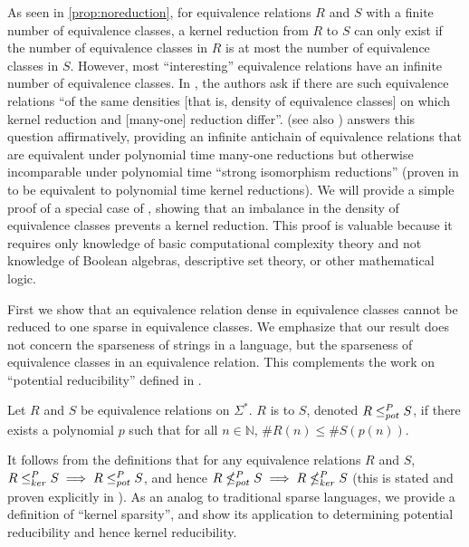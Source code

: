 As seen in \autoref{prop:noreduction}, for equivalence relations $R$ and $S$ with a finite number of equivalence classes, a kernel reduction from $R$ to $S$ can only exist if the number of equivalence classes in $R$ is at most the number of equivalence classes in $S$.
However, most ``interesting'' equivalence relations have an infinite number of equivalence classes.
In \autocite[Section~4]{fg11}, the authors ask if there are such equivalence relations ``of the same densities [that is, density of equivalence classes] on which kernel reduction and [many-one] reduction differ''.
\autocite[Theorem~5.1]{bcffm} (see also \autocite[Remark~5.2]{bcffm}) answers this question affirmatively, providing an infinite antichain of equivalence relations that are equivalent under polynomial time many-one reductions but otherwise incomparable under polynomial time ``strong isomorphism reductions'' (proven in \autocite[Section~7]{bcffm} to be equivalent to polynomial time kernel reductions).
We will provide a simple proof of a special case of \autocite[Theorem~5.1]{bcffm}, showing that an imbalance in the density of equivalence classes prevents a kernel reduction.
This proof is valuable because it requires only knowledge of basic computational complexity theory and not knowledge of Boolean algebras, descriptive set theory, or other mathematical logic.

First we show that an equivalence relation dense in equivalence classes cannot be reduced to one sparse in equivalence classes.
We emphasize that our result does not concern the sparseness of strings in a language, but the sparseness of equivalence classes in an equivalence relation.
This complements the work on ``potential reducibility'' defined in \autocite[Section~5]{bcffm}.

\begin{definition}
  Let $R$ and $S$ be equivalence relations on $\Sigma^*$.
  $R$ is  to $S$, denoted $R\leq^{P}_{pot} S$, if there exists a polynomial $p$ such that for all $n\in\mathbb{N}$, $\#R(n)\leq \#S(p(n))$.
\end{definition}

It follows from the definitions that for any equivalence relations $R$ and $S$, $R\leq^{P}_{ker} S\implies R\leq^{P}_{pot} S$, and hence $R\nleq^{P}_{pot} S \implies R\nleq^{P}_{ker} S$ (this is stated and proven explicitly in \autocite[Lemma~5.5]{bcffm}).
As an analog to traditional sparse languages, we provide a definition of ``kernel sparsity'', and show its application to determining potential reducibility and hence kernel reducibility.


